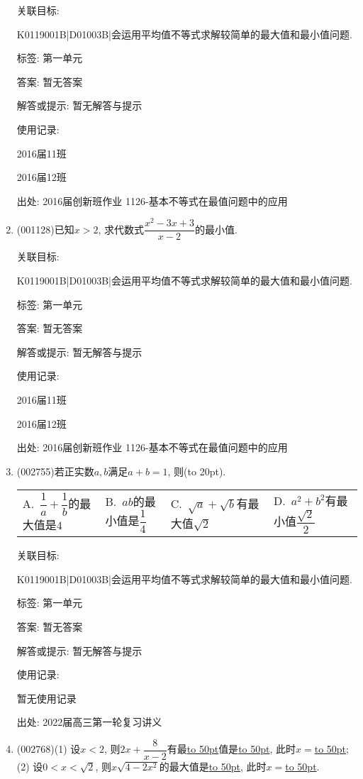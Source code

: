 \documentclass[10pt,a4paper]{article}
\newcommand{\blank}[1]{\underline{\hbox to #1pt{}}}
\newcommand{\bracket}[1]{(\hbox to #1pt{})}
\newcommand{\fourch}[4]{\par\begin{tabular}{p{.23\textwidth}p{.23\textwidth}p{.23\textwidth}p{.23\textwidth}}
A.~#1 &B.~#2& C.~#3& D.~#4
\end{tabular}}
\begin{document}
\begin{enumerate}[1.]
关联目标:

K0119001B|D01003B|会运用平均值不等式求解较简单的最大值和最小值问题.



标签: 第一单元

答案: 暂无答案

解答或提示: 暂无解答与提示

使用记录:

2016届11班	

2016届12班	


出处: 2016届创新班作业	1126-基本不等式在最值问题中的应用
\item { (001128)}已知$x>2$, 求代数式$\dfrac{x^2-3x+3}{x-2}$的最小值.


关联目标:

K0119001B|D01003B|会运用平均值不等式求解较简单的最大值和最小值问题.



标签: 第一单元

答案: 暂无答案

解答或提示: 暂无解答与提示

使用记录:

2016届11班	

2016届12班	


出处: 2016届创新班作业	1126-基本不等式在最值问题中的应用
\item { (002755)}若正实数$a,b$满足$a+b=1$, 则\bracket{20}.
\fourch{$\dfrac 1a+\dfrac 1b$的最大值是$4$}{$ab$的最小值是$\dfrac 14$}{$\sqrt a+\sqrt b$有最大值$\sqrt 2$}{$a^2+b^2$有最小值$\dfrac{\sqrt 2}2$}


关联目标:

K0119001B|D01003B|会运用平均值不等式求解较简单的最大值和最小值问题.



标签: 第一单元

答案: 暂无答案

解答或提示: 暂无解答与提示

使用记录:

暂无使用记录


出处: 2022届高三第一轮复习讲义
\item { (002768)}(1) 设$x<2$, 则$2x+\dfrac 8{x-2}$有最\blank{50}值是\blank{50}, 此时$x=$\blank{50};\\
(2) 设$0<x<\sqrt 2$, 则$x\sqrt{4-2{x^2}}$的最大值是\blank{50}, 此时$x=$\blank{50}.



\end{enumerate}
\end{document}
